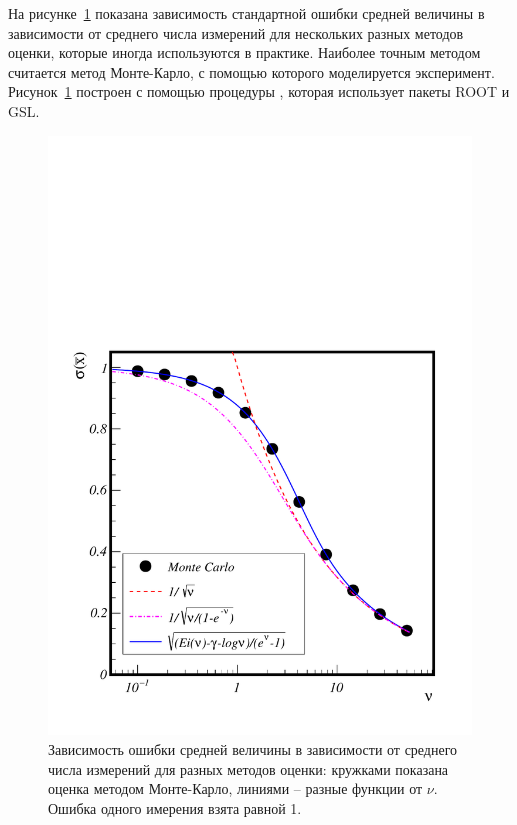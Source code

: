 \documentclass[12pt]{article}
\begin{document}
На рисунке~\ref{fig:sigmean} показана зависимость стандартной ошибки средней величины в зависимости от среднего числа измерений для нескольких разных
методов оценки, которые иногда используются в практике. Наиболее точным методом считается метод Монте-Карло, с помощью которого моделируется эксперимент. 
Рисунок~\ref{fig:sigmean} построен с помощью процедуры \cite{github_sigmeantoymc}, которая использует пакеты ROOT и GSL.

\begin{figure}[hp]
\begin{center}
\includegraphics[width=0.6\textheight]{sigmean.pdf}
\caption{\small Зависимость ошибки средней величины в зависимости от среднего числа измерений для разных методов оценки: кружками показана оценка 
методом Монте-Карло, линиями -- разные функции от $\nu$. Ошибка одного имерения взята равной 1.}
\label{fig:sigmean}
\end{center}
\end{figure}
\end{document}
